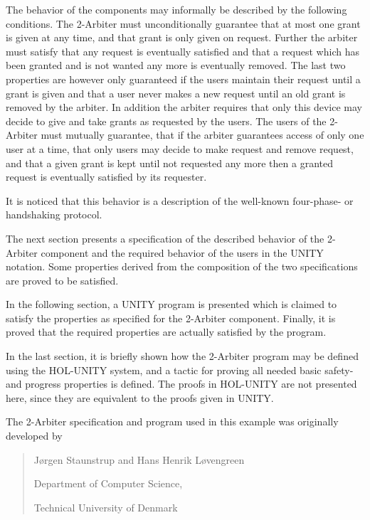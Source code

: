 The behavior of the components may informally be described by the following
conditions. The 2-Arbiter must unconditionally guarantee that at most one grant
is given at any time, and that grant is only given on request.  Further the
arbiter must satisfy that any request is eventually satisfied and that a
request which has been granted and is not wanted any more is eventually
removed. The last two properties are however only guaranteed if the users
maintain their request until a grant is given and that a user never makes a new
request until an old grant is removed by the arbiter.  In addition the arbiter
requires that only this device may decide to give and take grants as requested
by the users.  The users of the 2-Arbiter must mutually guarantee, that if the
arbiter guarantees access of only one user at a time, that only users may
decide to make request and remove request, and that a given grant is kept until
not requested any more then a granted request is eventually satisfied by its
requester.

It is noticed that this behavior is a description of the well-known four-phase-
or handshaking protocol.

The next section presents a specification of the described behavior of the
2-Arbiter component and the required behavior of the users in the UNITY
notation.  Some properties derived from the composition of the two
specifications are proved to be satisfied.

In the following section, a UNITY program is presented which is claimed to 
satisfy the properties as specified for the 2-Arbiter component.  Finally, it 
is proved that the required properties are actually satisfied by the program.

In the last section, it is briefly shown how the 2-Arbiter program may be 
defined using the HOL-UNITY system, and a tactic for proving all needed basic 
safety- and progress properties is defined.  The proofs in HOL-UNITY are not 
presented here, since they are equivalent to the proofs given in UNITY.

\bigskip
The 2-Arbiter specification and program used in this example was originally 
developed by

\begin{quotation}
	   J{\o}rgen Staunstrup and Hans Henrik L{\o}vengreen

	   Department of Computer Science,

	   Technical University of Denmark
\end{quotation}

